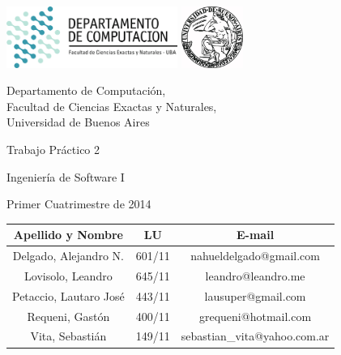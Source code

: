 \documentclass[a4paper, 10pt, twoside]{article}
\begin{document}


\thispagestyle{caratula}

\begin{center}

\includegraphics[height=2cm]{DC.png} 
\hfill
\includegraphics[height=2cm]{UBA.jpg} 

\vspace{2cm}

Departamento de Computación,\\
Facultad de Ciencias Exactas y Naturales,\\
Universidad de Buenos Aires

\vspace{4cm}

\begin{Huge}
Trabajo Práctico 2
\end{Huge}

\vspace{0.5cm}

\begin{Large}
Ingeniería de Software I
\end{Large}

\vspace{1cm}

Primer Cuatrimestre de 2014

\vspace{4cm}

\begin{tabular}{|c|c|c|}
\hline
Apellido y Nombre & LU & E-mail\\
\hline
Delgado, Alejandro N.  & 601/11 & nahueldelgado@gmail.com\\
Lovisolo, Leandro      & 645/11 & leandro@leandro.me\\
Petaccio, Lautaro José & 443/11 & lausuper@gmail.com\\
Requeni, Gastón        & 400/11 & grequeni@hotmail.com\\
Vita, Sebastián        & 149/11 & sebastian\_vita@yahoo.com.ar\\
\hline
\end{tabular}

\end{center}
\end{document}
